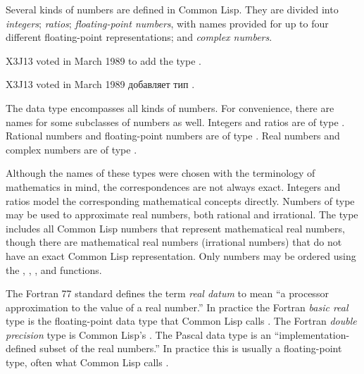Several kinds of numbers are defined in Common Lisp.
They are divided into \emph{integers}; \emph{ratios};
\emph{floating-point numbers}, with names provided for
up to four different floating-point representations; and \emph{complex numbers}.

\begin{newer}
X3J13 voted in March 1989  to add the type .

X3J13 voted in March 1989  добавляет тип .

The  data type encompasses all kinds of
             numbers.  For convenience, there are names for some
             subclasses of numbers as well.  Integers and ratios are of
             type .  Rational numbers and floating-point
             numbers are of type .  Real numbers and complex
             numbers are of type .

             Although the names of these types were chosen with the
             terminology of mathematics in mind, the correspondences
             are not always exact.  Integers and ratios model the
             corresponding mathematical concepts directly.  Numbers
             of type  may be used to approximate real
             numbers, both rational and irrational.  The  type
             includes all Common Lisp numbers that represent
             mathematical real numbers, though there are
             mathematical real numbers (irrational numbers)
             that do not have an exact Common Lisp representation.
             Only  numbers may be ordered using the \cdf{<}, \cdf{>}, \cdf{<=},
             and \cdf{>=} functions.

\beforenoterule
\begin{incompatibility}
The Fortran 77 standard defines the term
             \emph{real datum} to mean ``a processor approximation to the value
             of a real number.''  In practice the Fortran \emph{basic real} type
             is the floating-point data type that Common Lisp calls
             .  The Fortran \emph{double precision} type is
             Common Lisp's .  The Pascal  data type is
             an ``implementation-defined subset of the real numbers.''  In
             practice this is usually a floating-point type, often what
             Common Lisp calls .
\end{incompatibility}
\afternoterule
\end{newer}

